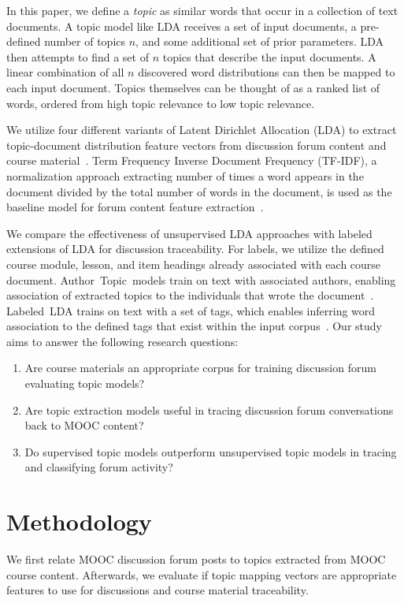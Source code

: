 \documentclass[sigconf, nonacm=true]{acmart}
\begin{document}
In this paper, we define a \textit{topic} as similar words that occur in a collection of text documents.
A topic model like LDA receives a set of input documents, a pre-defined number of topics $n$, and some additional set of prior parameters.
LDA then attempts to find a set of $n$ topics that describe the input documents.
A linear combination of all $n$ discovered word distributions can then be mapped to each input document.
Topics themselves can be thought of as a ranked list of words, ordered from high topic relevance to low topic relevance.

We utilize four different variants of Latent Dirichlet Allocation (LDA) to extract topic-document distribution feature vectors from discussion forum content and course material~\cite{blei2003latent}.
Term Frequency Inverse Document Frequency (TF-IDF), a normalization approach extracting number of times a word appears in the document divided by the total number of words in the document, is used as the baseline model for forum content feature extraction~\cite{SALTON1988513}.

We compare the effectiveness of unsupervised LDA approaches with labeled extensions of LDA for discussion traceability.
For labels, we utilize the defined course module, lesson, and item headings already associated with each course document.
Author~Topic~models train on text with associated authors, enabling association of extracted topics to the individuals that wrote the document~\cite{rosen2004author}.
Labeled~LDA trains on text with a set of tags, which enables inferring word association to the defined tags that exist within the input corpus~\cite{ramage2009labeled}.
Our study aims to answer the following research questions:

\begin{enumerate}[label=\textbf{RQ\arabic*:}]
    \item Are course materials an appropriate corpus for training discussion forum evaluating topic models? %
    \item Are topic extraction models useful in tracing discussion forum conversations back to MOOC content? %
    \item Do supervised topic models outperform unsupervised topic models in tracing and classifying forum activity? %
\end{enumerate}


\section{Methodology}
We first relate MOOC discussion forum posts to topics extracted from MOOC course content.
Afterwards, we evaluate if topic mapping vectors are appropriate features to use for discussions and course material traceability.
\end{document}
